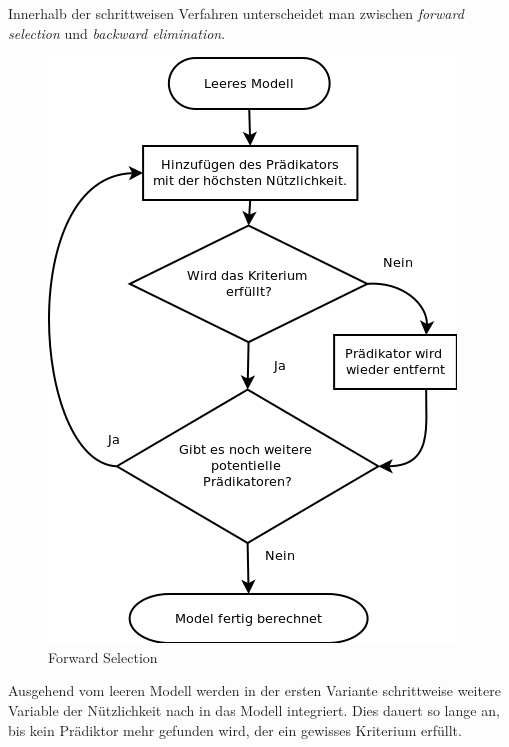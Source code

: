 Innerhalb der schrittweisen Verfahren unterscheidet man zwischen \textit{forward selection} und \textit{backward elimination}. 
\begin{figure}[H]
	\centering
	\includegraphics[height=0.5\textheight]{forward_stepwise.png}
	\caption{Forward Selection}
	\label{fig:forward_stepwise}
\end{figure}
Ausgehend vom leeren Modell werden in der ersten Variante schrittweise weitere Variable der Nützlichkeit nach in das Modell integriert. Dies dauert so lange an, bis kein Prädiktor mehr gefunden wird, der ein gewisses Kriterium erfüllt.
